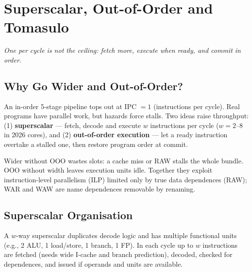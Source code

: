 \chapter{Superscalar, Out-of-Order and Tomasulo}\label{ch:superscalar}
\begin{center}\small\textit{One per cycle is not the ceiling: fetch more, execute when ready, and commit in order.}\end{center}

\section{Why Go Wider and Out-of-Order?}
An in-order 5-stage pipeline tops out at IPC $=1$ (instructions per cycle). Real programs have parallel work, but hazards force stalls. Two ideas raise throughput: (1) \textbf{superscalar} --- fetch, decode and execute $w$ instructions per cycle ($w=2$--$8$ in 2026 cores), and (2) \textbf{out-of-order execution} --- let a ready instruction overtake a stalled one, then restore program order at commit.

Wider without OOO wastes slots: a cache miss or RAW stalls the whole bundle. OOO without width leaves execution units idle. Together they exploit instruction-level parallelism (ILP) limited only by true data dependences (RAW); WAR and WAW are name dependences removable by renaming.

\section{Superscalar Organisation}
A $w$-way superscalar duplicates decode logic and has multiple functional units (e.g., 2 ALU, 1 load/store, 1 branch, 1 FP). In each cycle up to $w$ instructions are fetched (needs wide I-cache and branch prediction), decoded, checked for dependences, and issued if operands and units are available.

